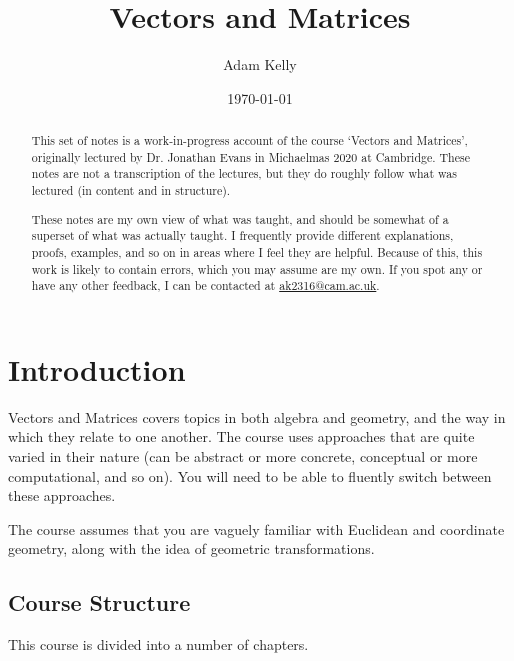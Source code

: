 \documentclass[a4paper]{scrreprt}
\title{Vectors and Matrices}
\author{Adam Kelly}
\date{\today}
\begin{document}
\maketitle

\begin{abstract}

	This set of notes is a work-in-progress account of the course `Vectors and Matrices', originally lectured by Dr. Jonathan Evans in Michaelmas 2020 at Cambridge. These notes are not a transcription of the lectures, but they do roughly follow what was lectured (in content and in structure).

	These notes are my own view of what was taught, and should be somewhat of a superset of what was actually taught. I frequently provide different explanations, proofs, examples, and so on in areas where I feel they are helpful. Because of this, this work is likely to contain errors, which you may assume are my own. If you spot any or have any other feedback, I can be contacted at \href{mailto:ak2316@cam.ac.uk}{ak2316@cam.ac.uk}.

\end{abstract}

\tableofcontents

\clearpage

\chapter{Introduction}

Vectors and Matrices covers topics in both algebra and geometry, and the way in which they relate to one another. The course uses approaches that are quite varied in their nature (can be abstract or more concrete, conceptual or more computational, and so on). You will need to be able to fluently switch between these approaches.

The course assumes that you are vaguely familiar with Euclidean and coordinate geometry, along with the idea of geometric transformations.

\section{Course Structure}

This course is divided into a number of chapters.
\end{document}
